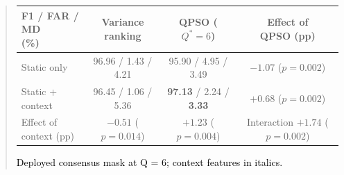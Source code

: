 \documentclass[11pt]{article}
\newenvironment{excerpt}{\begin{quote}\sloppy}{\end{quote}}
\begin{document}
\begin{excerpt}
\begin{table}[H]
\color{black}
\setlength{\tabcolsep}{3pt}
\begin{adjustbox}{max width=\linewidth}
\begin{tabular}{lccc}
\hline\toprule
\makecell[l]{F1 / FAR / MD\\(\%)} & \makecell{Variance\\ranking} & \makecell{QPSO\\($Q^{*}{=}6$)} & \makecell{Effect of\\QPSO (pp)} \\
\hline\toprule
Static only & 96.96 / 1.43 / 4.21 & 95.90 / 4.95 / 3.49 & \makecell{$-1.07$\\($p{=}0.002$)} \\
\makecell[l]{Static +\\context} & 96.45 / 1.06 / 5.36 & \textbf{97.13} / 2.24 / \textbf{3.33} & \makecell{$+0.68$\\($p{=}0.002$)} \\
\midrule
\makecell[l]{Effect of\\context (pp)} & \makecell{$-0.51$\\($p{=}0.014$)} & \makecell{$+1.23$\\($p{=}0.004$)} & \makecell{Interaction\\$+1.74$\\($p{=}0.002$)} \\
\hline\toprule
\end{tabular}
\end{adjustbox}
\end{table}

\setcounter{table}{10}
\begin{table}[H]
\centering
\scriptsize
\caption{\textcolor{black}{Deployed consensus mask at Q = 6; context features in italics.}}


\end{table}
\end{excerpt}
\end{document}
